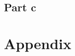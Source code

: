 \documentclass[10pt]{article}
\begin{document}
\begin{figure}[H]
\end{figure}

\subsection*{Part c}


\section*{Appendix}
\end{document}
